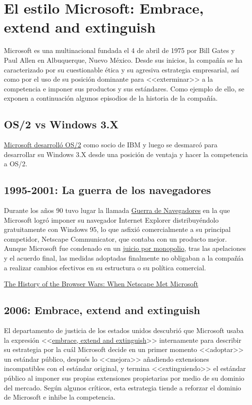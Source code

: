 \section{El estilo Microsoft: Embrace, extend and extinguish}
Microsoft es una multinacional fundada el 4 de abril de 1975 por Bill Gates y Paul Allen en Albuquerque, Nuevo México. Desde sus inicios, la compañía se ha caracterizado por su cuestionable ética y su agresiva estrategia empresarial, así como por el uso de su posición dominante para <<exterminar>> a la competencia e imponer sus productos y sus estándares. Como ejemplo de ello, se exponen a continuación algunos episodios de la historia de la compañía.

\subsection{OS/2 vs Windows 3.X}
\href{https://www.quora.com/Why-did-IBMs-OS-2-project-lose-to-Microsoft-given-that-IBM-had-much-more-resources-than-Microsoft-at-that-time}{Microsoft desarrolló OS/2} como socio de IBM y luego se desmarcó para desarrollar su Windows 3.X desde una posición de ventaja y hacer la competencia a OS/2.

\subsection{1995-2001: La guerra de los navegadores}
Durante los años 90 tuvo lugar la llamada \href{https://es.wikipedia.org/wiki/Guerra_de_navegadores}{Guerra de Navegadores} en la que Microsoft logró imponer su navegador Internet Explorer distribuyéndolo gratuitamente con Windows 95, lo que asfixió comercialmente a su principal competidor, Netscape Communicator, que contaba con un producto mejor. Aunque Microsoft fue condenado en un \href{https://es.wikipedia.org/wiki/Caso_Estados_Unidos_contra_Microsoft}{juicio por monopolio}, tras las apelaciones y el acuerdo final, las medidas adoptadas finalmente no obligaban a la compañía a realizar cambios efectivos en su estructura o su política comercial.

\href{https://thehistoryoftheweb.com/browser-wars/}{The History of the Browser Wars: When Netscape Met Microsoft}

\subsection{2006: Embrace, extend and extinguish}
El departamento de justicia de los estados unidos descubrió que Microsoft usaba la expresión <<\href{https://en.wikipedia.org/wiki/Embrace,_extend,_and_extinguish}{embrace, extend and extinguish}>> internamente para describir su estrategia por la cuál Microsoft decide en un primer momento <<adoptar>> un estándar público, después lo <<mejora>> añadiendo extensiones incompatibles con el estándar original, y termina <<extinguiendo>> el estándar público al imponer sus propias extensiones propietarias por medio de su dominio del mercado. Según algunos críticos, esta estrategia tiende a reforzar el dominio de Microsoft e inhibe la competencia.